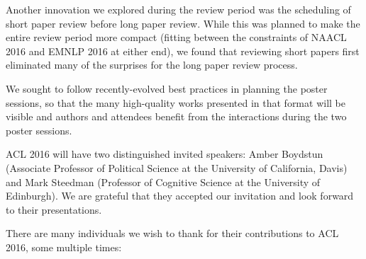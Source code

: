 Another innovation we explored during the review period was the scheduling of short paper review before long paper review.  While this was planned to make the entire review period more compact (fitting between the constraints of NAACL 2016 and EMNLP 2016 at either end), we found that reviewing short papers first eliminated many of the surprises for the long paper review process.

We sought to follow recently-evolved best practices in planning the poster sessions, so that the many high-quality works presented in that format will be visible and authors and attendees benefit from the interactions during the two poster sessions.

ACL 2016 will have two distinguished invited speakers: Amber Boydstun (Associate Professor of Political Science at the University of California, Davis) and Mark Steedman (Professor of Cognitive Science at the University of Edinburgh). We are grateful that they accepted our invitation and look forward to their presentations.

There are many individuals we wish to thank for their contributions to ACL 2016, some multiple times:

